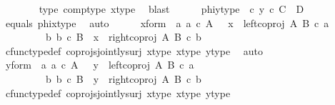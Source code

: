 \begin{isabellebody}
\ \ \ \ \ \ \isamarkupfalse%
\ {\isasymphi}{\isacharunderscore}{\kern0pt}type\ comp{\isacharunderscore}{\kern0pt}type\ x{\isacharunderscore}{\kern0pt}type{}\ \isamarkupfalse%
\ blast\isanewline
\ \ \ \ \isamarkupfalse%
\ phiy{\isacharunderscore}{\kern0pt}type{\isacharcolon}{\kern0pt}\ {\isachardoublequoteopen}{\isasymphi}\ {\isasymcirc}\isactrlsub c\ y\ {\isasymin}\isactrlsub c\ C\ {\isasymCoprod}\ D{\isachardoublequoteclose}\isanewline
\ \ \ \ \ \ \isamarkupfalse%
\ equals\ phix{\isacharunderscore}{\kern0pt}type\ \isamarkupfalse%
\ auto\isanewline
\isanewline
\ \ \ \ \isamarkupfalse%
\ x{\isacharunderscore}{\kern0pt}form{\isacharcolon}{\kern0pt}\ {\isachardoublequoteopen}{\isacharparenleft}{\kern0pt}{\isasymexists}\ a{\isachardot}{\kern0pt}\ a\ {\isasymin}\isactrlsub c\ A\ \ {\isasymand}\ x\ {\isacharequal}{\kern0pt}\ left{\isacharunderscore}{\kern0pt}coproj\ A\ B\ {\isasymcirc}\isactrlsub c\ a{\isacharparenright}{\kern0pt}\isanewline
\ \ \ \ \ \ {\isasymor}\ \ {\isacharparenleft}{\kern0pt}{\isasymexists}\ b{\isachardot}{\kern0pt}\ b\ {\isasymin}\isactrlsub c\ B\ {\isasymand}\ x\ {\isacharequal}{\kern0pt}\ right{\isacharunderscore}{\kern0pt}coproj\ A\ B\ {\isasymcirc}\isactrlsub c\ b{\isacharparenright}{\kern0pt}{\isachardoublequoteclose}\isanewline
\ \ \ \ \ \ \isamarkupfalse%
\ cfunc{\isacharunderscore}{\kern0pt}type{\isacharunderscore}{\kern0pt}def\ coprojs{\isacharunderscore}{\kern0pt}jointly{\isacharunderscore}{\kern0pt}surj\ x{\isacharunderscore}{\kern0pt}type\ x{\isacharunderscore}{\kern0pt}type{}\ y{\isacharunderscore}{\kern0pt}type\ \isamarkupfalse%
\ auto\isanewline
\ \ \ \ \isanewline
\ \ \ \ \isamarkupfalse%
\ y{\isacharunderscore}{\kern0pt}form{\isacharcolon}{\kern0pt}\ {\isachardoublequoteopen}{\isacharparenleft}{\kern0pt}{\isasymexists}\ a{\isachardot}{\kern0pt}\ a\ {\isasymin}\isactrlsub c\ A\ \ {\isasymand}\ y\ {\isacharequal}{\kern0pt}\ left{\isacharunderscore}{\kern0pt}coproj\ A\ B\ {\isasymcirc}\isactrlsub c\ a{\isacharparenright}{\kern0pt}\isanewline
\ \ \ \ \ \ {\isasymor}\ \ {\isacharparenleft}{\kern0pt}{\isasymexists}\ b{\isachardot}{\kern0pt}\ b\ {\isasymin}\isactrlsub c\ B\ {\isasymand}\ y\ {\isacharequal}{\kern0pt}\ right{\isacharunderscore}{\kern0pt}coproj\ A\ B\ {\isasymcirc}\isactrlsub c\ b{\isacharparenright}{\kern0pt}{\isachardoublequoteclose}\isanewline
\ \ \ \ \ \ \isamarkupfalse%
\ cfunc{\isacharunderscore}{\kern0pt}type{\isacharunderscore}{\kern0pt}def\ coprojs{\isacharunderscore}{\kern0pt}jointly{\isacharunderscore}{\kern0pt}surj\ x{\isacharunderscore}{\kern0pt}type\ x{\isacharunderscore}{\kern0pt}type{}\ y{\isacharunderscore}{\kern0pt}type\ \isamarkupfalse%

\end{isabellebody}
